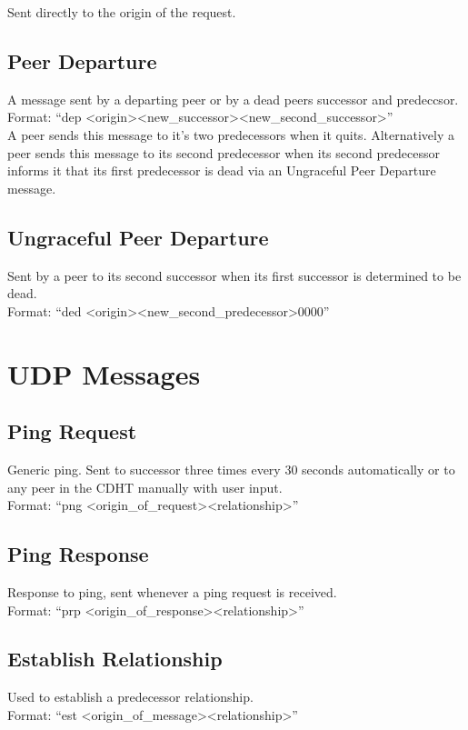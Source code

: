 \documentclass[a4paper]{article}
\begin{document}
Sent directly to the origin of the request.

\subsection{Peer Departure}
A message sent by a departing peer or by a dead peers successor and predeccsor. \\
Format: ``dep \textless origin\textgreater  \textless new\_successor\textgreater  \textless new\_second\_successor\textgreater '' \\

A peer sends this message to it's two predecessors when it quits. Alternatively a peer sends this message to its second predecessor when its second predecessor informs it that its first predecessor is dead via an Ungraceful Peer Departure message.

\subsection{Ungraceful Peer Departure}
Sent by a peer to its second successor when its first successor is determined to be dead.\\
Format: ``ded \textless origin\textgreater  \textless new\_second\_predecessor\textgreater  0000''


\section{UDP Messages}

\subsection{Ping Request}
Generic ping. Sent to successor three times every 30 seconds automatically or to any peer in the CDHT manually with user input.\\
Format: ``png \textless origin\_of\_request\textgreater  \textless relationship\textgreater ''

\subsection{Ping Response}
Response to ping, sent whenever a ping request is received.\\
Format: ``prp \textless origin\_of\_response\textgreater  \textless relationship\textgreater ''

\subsection{Establish Relationship}
Used to establish a predecessor relationship.\\
Format: ``est \textless origin\_of\_message\textgreater  \textless relationship\textgreater ''
\end{document}
